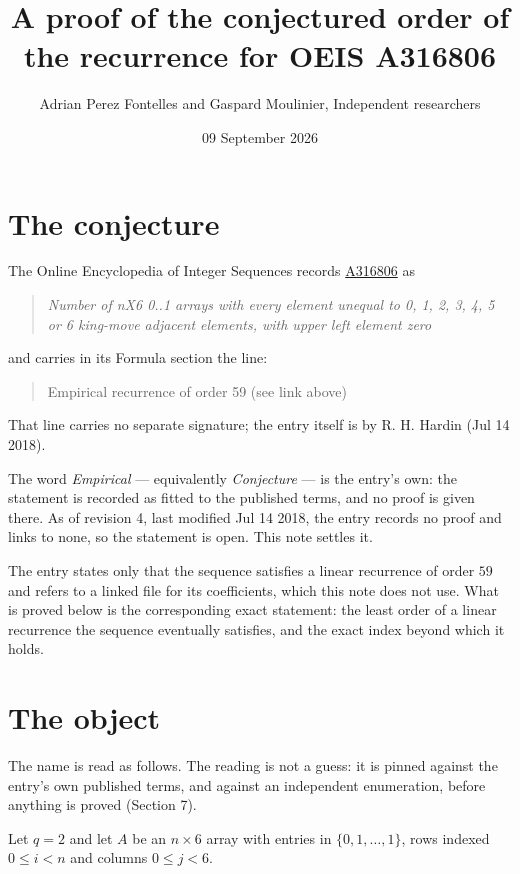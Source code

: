 \documentclass[11pt]{article}
\title{A proof of the conjectured order of the recurrence for OEIS A316806}
\author{Adrian Perez Fontelles and Gaspard Moulinier, Independent researchers}
\date{09 September 2026}
\theoremstyle{definition}
\begin{document}
\maketitle
\section{The conjecture}

The Online Encyclopedia of Integer Sequences records \href{https://oeis.org/A316806}{A316806} as

\begin{quote}\itshape Number of nX6 0..1 arrays with every element unequal to 0, 1, 2, 3, 4, 5 or 6 king-move adjacent elements, with upper left element zero\end{quote}

and carries in its Formula section the line:

\begin{quote}\ttfamily Empirical recurrence of order 59 (see link above)\end{quote}

That line carries no separate signature; the entry itself is by R. H. Hardin (Jul 14 2018).

The word {\itshape Empirical} --- equivalently {\itshape Conjecture} --- is the entry's own: the statement is recorded as fitted to the published terms, and no proof is given there. As of revision 4, last modified Jul 14 2018, the entry records no proof and links to none, so the statement is open. This note settles it.

The entry states only that the sequence satisfies a linear recurrence of order $59$ and refers to a linked file for its coefficients, which this note does not use. What is proved below is the corresponding exact statement: the least order of a linear recurrence the sequence eventually satisfies, and the exact index beyond which it holds.

\section{The object}

The name is read as follows. The reading is not a guess: it is pinned against the entry's own published terms, and against an independent enumeration, before anything is proved (Section 7).

Let $q = 2$ and let $A$ be an $n \times 6$ array with entries in $\{0,1,\dots,1\}$, rows indexed $0 \le i < n$ and columns $0 \le j < 6$.
\end{document}
